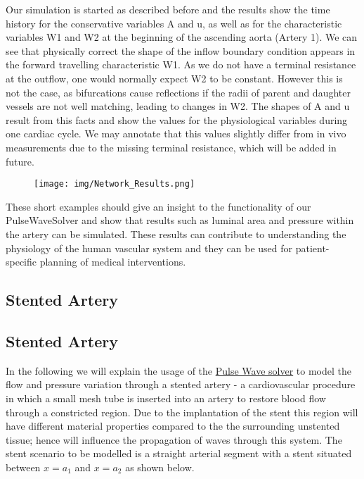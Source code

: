 Our simulation is started as described before and the results show the time
history for the conservative variables A and u, as well as for the
characteristic variables W1 and W2 at the beginning of the ascending aorta
(Artery 1). We can see that physically correct the shape of the inflow boundary
condition appears in the forward travelling characteristic W1. As we do not have
a terminal resistance at the outflow, one would normally expect W2 to be
constant. However this is not the case, as bifurcations cause reflections if the
radii of parent and daughter vessels are not well matching, leading to changes
in W2. The shapes of A and u result from this facts and show the values for the
physiological variables during one cardiac cycle. We may annotate that this
values slightly differ from in vivo measurements due to the missing terminal
resistance, which will be added in future.

\begin{figure}
	\texttt{[image: img/Network\_Results.png]}
\end{figure}

These short examples should give an insight to the functionality of our
PulseWaveSolver and show that results such as luminal area and pressure within
the artery can be simulated. These results can contribute to understanding the
physiology of the human vascular system and they can be used for
patient-specific planning of medical interventions.



\subsection{Stented Artery}
\subsection{Stented Artery}
In the following we will explain the usage of the  \hyperref[PulseWaveSolver]{Pulse Wave solver} to model the flow and pressure variation through a stented artery - a cardiovascular procedure in which a small mesh tube is inserted into an artery to restore blood flow through a constricted region. Due to the implantation of the stent this region will have different material properties compared to the the surrounding unstented tissue; hence will influence the propagation of waves through this system. The stent scenario to be modelled is a straight arterial segment with a stent situated between $x=a_{1}$ and $x=a_{2}$ as shown below.

